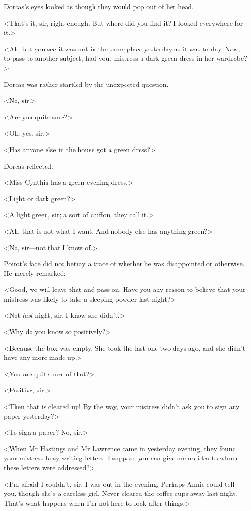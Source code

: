  Dorcas's eyes looked as though they would pop out of her head. 

 <That's it, sir, right enough. But where did you find it? I looked everywhere for it.> 

 <Ah, but you see it was not in the same place yesterday as it was to-day. Now, to pass to another subject, had your mistress a dark green dress in her wardrobe?> 

 Dorcas was rather startled by the unexpected question. 

 <No, sir.> 

 <Are you quite sure?> 

 <Oh, yes, sir.> 

 <Has anyone else in the house got a green dress?> 

 Dorcas reflected. 

 <Miss Cynthia has a green evening dress.> 

 <Light or dark green?> 

 <A light green, sir; a sort of chiffon, they call it.> 

 <Ah, that is not what I want. And nobody else has anything green?> 

 <No, sir—not that I know of.> 

 Poirot's face did not betray a trace of whether he was disappointed or otherwise. He merely remarked: 

 <Good, we will leave that and pass on. Have you any reason to believe that your mistress was likely to take a sleeping powder last night?> 

 <Not \emph{last} night, sir, I know she didn't.> 

 <Why do you know so positively?> 

 <Because the box was empty. She took the last one two days ago, and she didn't have any more made up.> 

 <You are quite sure of that?> 

 <Positive, sir.> 

 <Then that is cleared up! By the way, your mistress didn't ask you to sign any paper yesterday?> 

 <To sign a paper? No, sir.> 

 <When Mr Hastings and Mr Lawrence came in yesterday evening, they found your mistress busy writing letters. I suppose you can give me no idea to whom these letters were addressed?> 

 <I'm afraid I couldn't, sir. I was out in the evening. Perhaps Annie could tell you, though she's a careless girl. Never cleared the coffee-cups away last night. That's what happens when I'm not here to look after things.> 

